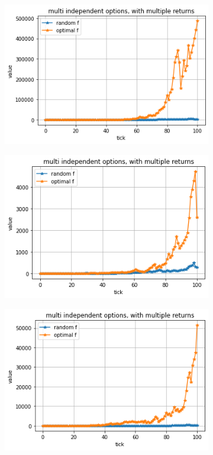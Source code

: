 \documentclass{article}
\begin{document}
	\begin{figure}[!h]
		\begin{subfigure}{0.525\textwidth}
			\includegraphics[width=0.9\linewidth]{multi1} 
		\end{subfigure}
		\begin{subfigure}{0.525\textwidth}
			\includegraphics[width=0.9\linewidth]{multi2}
		\end{subfigure}
		\begin{subfigure}{0.525\textwidth}
		\includegraphics[width=0.9\linewidth]{multi3}

\end{subfigure}
\end{figure}
\end{document}

